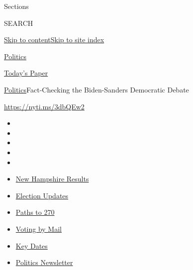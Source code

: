 Sections

SEARCH

\protect\hyperlink{site-content}{Skip to
content}\protect\hyperlink{site-index}{Skip to site index}

\href{https://www.nytimes3xbfgragh.onion/section/politics}{Politics}

\href{https://myaccount.nytimes3xbfgragh.onion/auth/login?response_type=cookie\&client_id=vi}{}

\href{https://www.nytimes3xbfgragh.onion/section/todayspaper}{Today's
Paper}

\href{/section/politics}{Politics}\textbar{}Fact-Checking the
Biden-Sanders Democratic Debate

\url{https://nyti.ms/3dbQEw2}

\begin{itemize}
\item
\item
\item
\item
\item
\end{itemize}

\begin{itemize}
\item
  \href{https://www.nytimes3xbfgragh.onion/interactive/2020/09/08/us/elections/results-new-hampshire-primary-elections.html?action=click\&pgtype=Article\&state=default\&region=TOP_BANNER\&context=storylines_menu}{New
  Hampshire Results}
\item
  \href{https://www.nytimes3xbfgragh.onion/live/2020/09/08/us/trump-vs-biden?action=click\&pgtype=Article\&state=default\&region=TOP_BANNER\&context=storylines_menu}{Election
  Updates}
\item
  \href{https://www.nytimes3xbfgragh.onion/interactive/2020/us/elections/election-states-biden-trump.html?action=click\&pgtype=Article\&state=default\&region=TOP_BANNER\&context=storylines_menu}{Paths
  to 270}
\item
  \href{https://www.nytimes3xbfgragh.onion/interactive/2020/08/31/us/politics/vote-by-mail-deadlines.html?action=click\&pgtype=Article\&state=default\&region=TOP_BANNER\&context=storylines_menu}{Voting
  by Mail}
\item
  \href{https://www.nytimes3xbfgragh.onion/interactive/2019/us/elections/2020-presidential-election-calendar.html?action=click\&pgtype=Article\&state=default\&region=TOP_BANNER\&context=storylines_menu}{Key
  Dates}
\item
  \href{https://www.nytimes3xbfgragh.onion/newsletters/politics?action=click\&pgtype=Article\&state=default\&region=TOP_BANNER\&context=storylines_menu}{Politics
  Newsletter}
\end{itemize}

